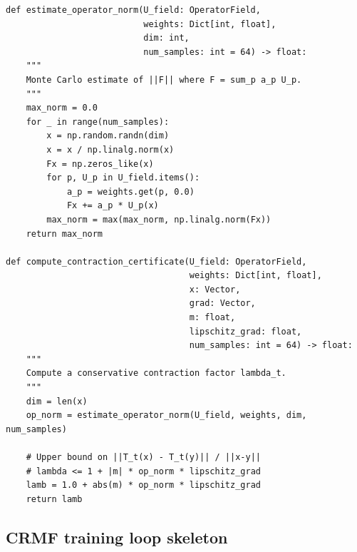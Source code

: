 \documentclass[11pt]{article}
\begin{document}
\begin{verbatim}
def estimate_operator_norm(U_field: OperatorField,
                           weights: Dict[int, float],
                           dim: int,
                           num_samples: int = 64) -> float:
    """
    Monte Carlo estimate of ||F|| where F = sum_p a_p U_p.
    """
    max_norm = 0.0
    for _ in range(num_samples):
        x = np.random.randn(dim)
        x = x / np.linalg.norm(x)
        Fx = np.zeros_like(x)
        for p, U_p in U_field.items():
            a_p = weights.get(p, 0.0)
            Fx += a_p * U_p(x)
        max_norm = max(max_norm, np.linalg.norm(Fx))
    return max_norm

def compute_contraction_certificate(U_field: OperatorField,
                                    weights: Dict[int, float],
                                    x: Vector,
                                    grad: Vector,
                                    m: float,
                                    lipschitz_grad: float,
                                    num_samples: int = 64) -> float:
    """
    Compute a conservative contraction factor lambda_t.
    """
    dim = len(x)
    op_norm = estimate_operator_norm(U_field, weights, dim, num_samples)

    # Upper bound on ||T_t(x) - T_t(y)|| / ||x-y||
    # lambda <= 1 + |m| * op_norm * lipschitz_grad
    lamb = 1.0 + abs(m) * op_norm * lipschitz_grad
    return lamb
\end{verbatim}

\subsection{CRMF training loop skeleton}
\end{document}
